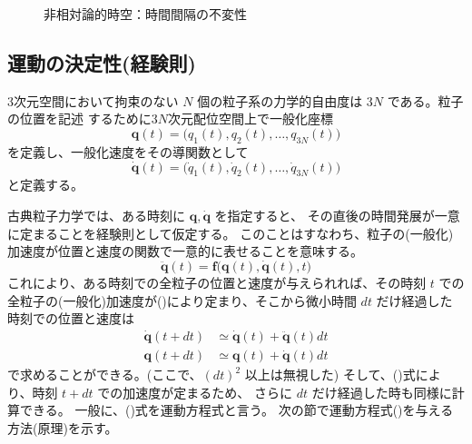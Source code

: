 \documentclass[a4paper,11pt]{ltjsarticle}
\newcommand{\qv}{\bm{q}}
\begin{document}
\begin{figure}[htbp]
  \caption{非相対論的時空：時間間隔の不変性}
  \label{fig:time}
\end{figure}

\FloatBarrier
\subsection{運動の決定性(経験則)}
\label{sec:Motion}
3次元空間において拘束のない $N$ 個の粒子系の力学的自由度は $3N$ である。粒子の位置を記述
するために$3N$次元配位空間上で一般化座標 
\[
\bm{q}(t)=\bigl(q_1(t),q_2(t),\ldots,q_{3N}(t)\bigr)
\]
を定義し、一般化速度をその導関数として 
\[
\dot{\bm{q}}(t)=\bigl(\dot{q}_1(t),\dot{q}_2(t),\ldots,\dot{q}_{3N}(t)\bigr)
\]
と定義する。

古典粒子力学では、ある時刻に \(\bm{q},\dot{\qv}\) を指定すると、
その直後の時間発展が一意に定まることを経験則として仮定する。
このことはすなわち、粒子の(一般化)加速度が位置と速度の関数で一意的に表せることを意味する。
\begin{equation}
\ddot{\bm{q}}(t)=\bm{f}\bigl(\bm{q}(t),\dot{\bm{q}}(t),t\bigr)
\label{eq:accelaration}
\end{equation}
これにより、ある時刻での全粒子の位置と速度が与えられれば、その時刻 $t$ での全粒子の(一般化)加速度が()により定まり、そこから微小時間 $dt$
だけ経過した時刻での位置と速度は
\begin{align*}
\dot{\qv}(t+dt)&\simeq\dot{\qv}(t)+\ddot{\qv}(t)dt\\
\qv(t+dt)&\simeq\qv(t)+\dot{\qv}(t)dt
\end{align*}
で求めることができる。(ここで、$(dt)^2$ 以上は無視した) そして、()式により、時刻 $t+dt$ での加速度が定まるため、
さらに $dt$ だけ経過した時も同様に計算できる。
一般に、()式を運動方程式と言う。
次の節で運動方程式()を与える方法(原理)を示す。
\end{document}
